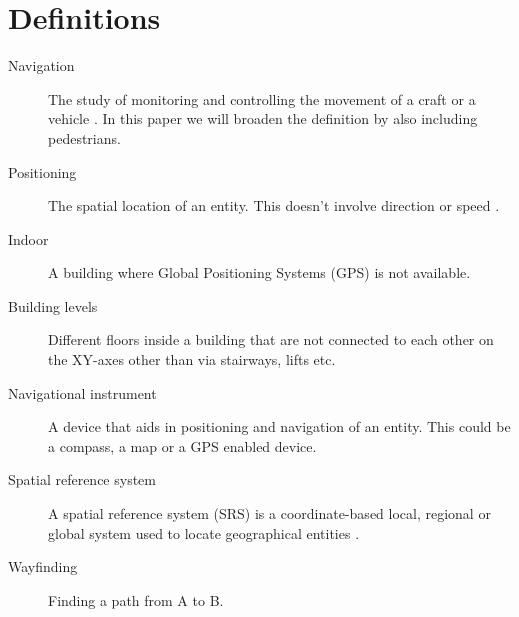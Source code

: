 \section{Definitions} %
\label{sec:definitions}

\begin{description}
	\item[Navigation] The study of monitoring and controlling the movement of a craft or a vehicle \cite{wiki_navi}. In this paper we will broaden the definition by also including pedestrians.
	
	\item[Positioning] The spatial location of an entity. This doesn't involve direction or speed \cite{wiki_pos}.
	
	\item[Indoor] A building where Global Positioning Systems (GPS) is not available.
	
	\item[Building levels] Different floors inside a building that are not connected to each other on the XY-axes other than via stairways, lifts etc.
	
	\item[Navigational instrument] A device that aids in positioning and navigation of an entity. This could be a compass, a map or a GPS enabled device.
	
	
	\item[Spatial reference system] A spatial reference system (SRS) is a coordinate-based local, regional or global system used to locate geographical entities \cite{wiki_srs}.

	\item[Wayfinding]Finding a path from A to B.

\end{description}

